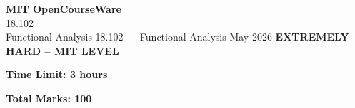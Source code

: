 \documentclass[12pt,a4paper]{exam}
\begin{document}
\begin{center}
{\LARGE \textbf{MIT OpenCourseWare}}\\18.102\\Functional Analysis
\vspace{0.5cm}
{18.102} --- {Functional Analysis}
\vspace{0.3cm}
May 2026
\vspace{0.3cm}
\textbf{EXTREMELY HARD -- MIT LEVEL}
\end{center}

\begin{center}
\textbf{Time Limit: 3 hours}
\end{center}

\begin{center}
\textbf{Total Marks: 100}
\end{center}

\vspace{0.5cm}
\end{document}
